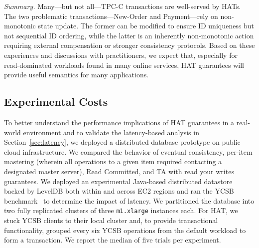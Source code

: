 \vspace{.5em}\noindent\textit{Summary.} Many---but not all---TPC-C transactions are well-served by
HATs. The two problematic transactions---New-Order and Payment---rely
on non-monotonic state update. The former can be modified to ensure ID
uniqueness but not sequential ID ordering, while the latter is an
inherently non-monotonic action requiring external compensation or
stronger consistency protocols. Based on these experiences and
discussions with practitioners, we expect that, especially for
read-dominated workloads found in many online services, HAT guarantees
will provide useful semantics for many applications.

\subsection{Experimental Costs}
\label{sec:prototype}

To better understand the performance implications of HAT guarantees in
a real-world environment and to validate the latency-based analysis in
Section~\ref{sec:latency}, we deployed a distributed database
prototype on public cloud infrastructure. We compared the behavior of
eventual consistency, per-item mastering (wherein all operations to a
given item required contacting a designated master server), Read
Committed, and TA with read your writes guarantees. We deployed an
experimental Java-based distributed datastore backed by LevelDB both
within and across EC2 regions and ran the YCSB benchmark~\cite{ycsb}
to determine the impact of latency. We partitioned the database into
two fully replicated clusters of three \texttt{m1.xlarge} instances
each. For HAT, we stuck YCSB clients to their local cluster and, to
provide transactional functionality, grouped every six YCSB operations
from the default workload to form a transaction. We report the median
of five trials per experiment.

